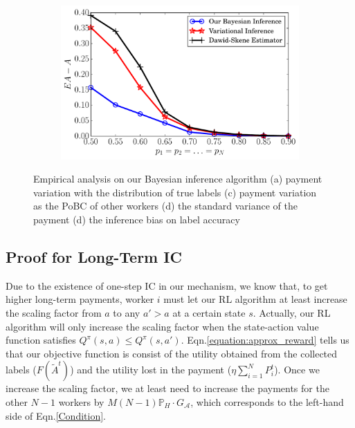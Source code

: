 \begin{figure}[!t]
\begin{subfigure}[t]{0.24\textwidth}
        \caption{\label{BIM4}}
    \end{subfigure}
	~
	\begin{subfigure}[t]{0.24\textwidth}
        \centering
        \includegraphics[width=\textwidth]{image/EXPC1}
        \caption{\label{BIM1}}
    \end{subfigure}
	\vspace{-3mm}
    \caption{\label{BIM}Empirical analysis on our Bayesian inference algorithm (a) payment variation with the distribution of true labels (c) payment variation as the PoBC of other workers (d) the standard variance of the payment (d) the inference bias on label accuracy}
\vspace{-3mm}
\end{figure}
\subsection{Proof for Long-Term IC}
Due to the existence of one-step IC in our mechanism, we know that, to get higher long-term payments, worker $i$ must let our RL algorithm at least increase the scaling factor from $a$ to any $a'>a$ at a certain state $s$.
Actually, our RL algorithm will only increase the scaling factor when the state-action value function satisfies $Q^{\pi}(s,a)\leq Q^{\pi}(s,a')$.
Eqn.\ref{equation:approx_reward} tells us that our objective function is consist of the utility obtained from the collected labels ($F(\tilde{A}^t)$) and the utility lost in the payment ($\eta {\sum}_{i=1}^{N}P^t_i$).
Once we increase the scaling factor, we at least need to increase the payments for the other $N-1$ workers by $M(N-1)\mathbb{P}_H\cdot G_{\mathcal{A}}$, which corresponds to the left-hand side of Eqn.\ref{Condition}.

